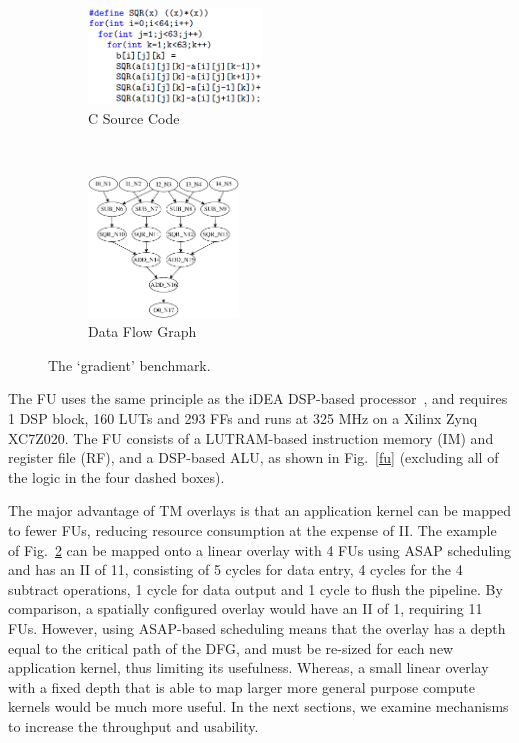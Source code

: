 \begin{figure}[t]
	\centering
	\begin{subfigure}[t]{0.2\textwidth}
		\centering
		\includegraphics[width=4.6cm]{figures/code.png}
		\caption{C Source Code}
		\label{code}
	\end{subfigure}
	~~
	\begin{subfigure}[t]{0.24\textwidth}
		\centering
		\includegraphics[width=4cm]{figures/DFG.pdf}
		\caption{Data Flow Graph}
		\label{dfg}
	\end{subfigure}
	\caption{The `gradient' benchmark.}
	\label{dfgs}
\end{figure} 


The FU uses the same principle as the iDEA DSP-based processor~\cite{cheah2012idea}, and requires 1 DSP block, 160 LUTs and 293 FFs and runs at 325 MHz on a Xilinx Zynq XC7Z020.
The FU consists of a LUTRAM-based instruction memory (IM) and register file (RF), and a DSP-based ALU, as shown in Fig.~\ref{fu} (excluding all of the logic in the four dashed boxes). 

The major advantage of TM overlays is that an application kernel can be mapped to fewer FUs, reducing resource consumption at the expense of II. The example of Fig.~\ref{dfg} can be mapped onto a linear overlay with 4 FUs using ASAP scheduling and has an II of 11, consisting of 5 cycles for data entry, 4 cycles for the 4 subtract operations, 1 cycle for data output and 1 cycle to flush the pipeline.
By comparison, a spatially configured overlay would have an II of 1, requiring 11 FUs.
However, using ASAP-based scheduling means that the overlay has a depth equal to the critical path of the DFG, and must be re-sized for each new application kernel, thus limiting its usefulness. 
Whereas,  a small linear overlay with a fixed depth that is able to map larger more general purpose compute kernels would be much more useful.
In the next sections, we examine mechanisms to increase the throughput and usability.


